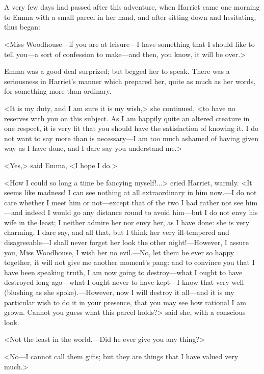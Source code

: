 \chapter[Chapter \thechapter]{}
\lettrine[lraise=0.3]{A}{}  very few days had passed after this adventure, when Harriet came one morning to Emma with a small parcel in her hand, and after sitting down and hesitating, thus began:

\zz
<Miss Woodhouse—if you are at leisure—I have something that I should like to tell you—a sort of confession to make—and then, you know, it will be over.>

Emma was a good deal surprized; but begged her to speak. There was a seriousness in Harriet's manner which prepared her, quite as much as her words, for something more than ordinary.

<It is my duty, and I am sure it is my wish,> she continued, <to have no reserves with you on this subject. As I am happily quite an altered creature in one respect, it is very fit that you should have the satisfaction of knowing it. I do not want to say more than is necessary—I am too much ashamed of having given way as I have done, and I dare say you understand me.>

<Yes,> said Emma, <I hope I do.>

<How I could so long a time be fancying myself!...> cried Harriet, warmly. <It seems like madness! I can see nothing at all extraordinary in him now.—I do not care whether I meet him or not—except that of the two I had rather not see him—and indeed I would go any distance round to avoid him—but I do not envy his wife in the least; I neither admire her nor envy her, as I have done: she is very charming, I dare say, and all that, but I think her very ill-tempered and disagreeable—I shall never forget her look the other night!—However, I assure you, Miss Woodhouse, I wish her no evil.—No, let them be ever so happy together, it will not give me another moment's pang: and to convince you that I have been speaking truth, I am now going to destroy—what I ought to have destroyed long ago—what I ought never to have kept—I know that very well (blushing as she spoke).—However, now I will destroy it all—and it is my particular wish to do it in your presence, that you may see how rational I am grown. Cannot you guess what this parcel holds?> said she, with a conscious look.

<Not the least in the world.—Did he ever give you any thing?>

<No—I cannot call them gifts; but they are things that I have valued very much.>

